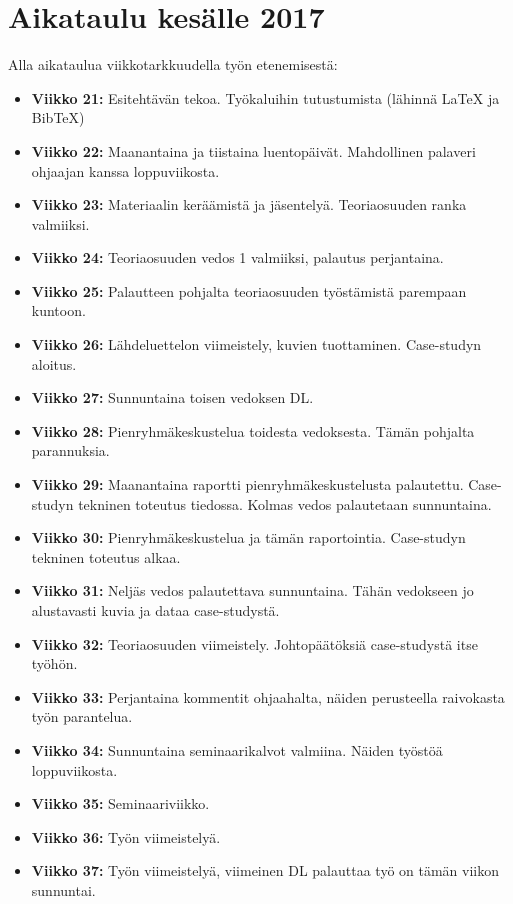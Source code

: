 \documentclass[a4paper, 12pt, finnish]{report} %
\begin{document}
\section{Aikataulu kesälle 2017}
Alla aikataulua viikkotarkkuudella työn etenemisestä:
\begin{itemize}
	\item \textbf{Viikko 21:} Esitehtävän tekoa. Työkaluihin tutustumista (lähinnä LaTeX ja BibTeX)
	\item \textbf{Viikko 22:} Maanantaina ja tiistaina luentopäivät. Mahdollinen palaveri ohjaajan kanssa loppuviikosta.
	\item \textbf{Viikko 23:} Materiaalin keräämistä ja jäsentelyä. Teoriaosuuden ranka valmiiksi.
	\item \textbf{Viikko 24:} Teoriaosuuden vedos 1 valmiiksi, palautus perjantaina.
	\item \textbf{Viikko 25:} Palautteen pohjalta teoriaosuuden työstämistä parempaan kuntoon.
	\item \textbf{Viikko 26:} Lähdeluettelon viimeistely, kuvien tuottaminen. Case-studyn aloitus.
	\item \textbf{Viikko 27:} Sunnuntaina toisen vedoksen DL.
	\item \textbf{Viikko 28:} Pienryhmäkeskustelua toidesta vedoksesta. Tämän pohjalta parannuksia.
	\item \textbf{Viikko 29:} Maanantaina raportti pienryhmäkeskustelusta palautettu. Case-studyn tekninen toteutus tiedossa. Kolmas vedos palautetaan sunnuntaina.
	\item \textbf{Viikko 30:} Pienryhmäkeskustelua ja tämän raportointia. Case-studyn tekninen toteutus alkaa.
	\item \textbf{Viikko 31:} Neljäs vedos palautettava sunnuntaina. Tähän vedokseen jo alustavasti kuvia ja dataa case-studystä.
	\item \textbf{Viikko 32:} Teoriaosuuden viimeistely. Johtopäätöksiä case-studystä itse työhön.
	\item \textbf{Viikko 33:} Perjantaina kommentit ohjaahalta, näiden perusteella raivokasta työn parantelua.
	\item \textbf{Viikko 34:} Sunnuntaina seminaarikalvot valmiina. Näiden työstöä loppuviikosta.
	\item \textbf{Viikko 35:} Seminaariviikko.
	\item \textbf{Viikko 36:} Työn viimeistelyä.
	\item \textbf{Viikko 37:} Työn viimeistelyä, viimeinen DL palauttaa työ on tämän viikon sunnuntai.

















\end{itemize}
\clearpage
\nocite{*}
\end{document}
